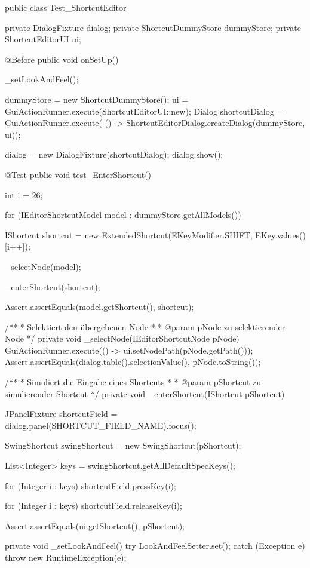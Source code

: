 \vspace{-12px}
  \begin{spacing}{0.75}
    \begin{javacode}[firstnumber=21]
public class Test_ShortcutEditor
{
  private DialogFixture dialog;
  private ShortcutDummyStore dummyStore;
  private ShortcutEditorUI ui;
  
  @Before
  public void onSetUp()
  {
    _setLookAndFeel();
    
    dummyStore = new ShortcutDummyStore();
    ui = GuiActionRunner.execute(ShortcutEditorUI::new);
    Dialog shortcutDialog = GuiActionRunner.execute(
    () -> ShortcutEditorDialog.createDialog(dummyStore, ui));
    
    dialog = new DialogFixture(shortcutDialog);
    dialog.show();
  }
  
  @Test
  public void test_EnterShortcut()
  {
    int i = 26;
    
    for (IEditorShortcutModel model : dummyStore.getAllModels())
    {
      IShortcut shortcut = new ExtendedShortcut(EKeyModifier.SHIFT, EKey.values()[i++]);
      
      _selectNode(model);
      
      _enterShortcut(shortcut);
      
      Assert.assertEquals(model.getShortcut(), shortcut);
    }
  }
  
  /**
  * Selektiert den übergebenen Node
  * 
  * @param pNode zu selektierender Node
  */
  private void _selectNode(IEditorShortcutNode pNode)
  {
    GuiActionRunner.execute(() -> ui.setNodePath(pNode.getPath()));
    Assert.assertEquals(dialog.table().selectionValue(), pNode.toString());
  }
  
  /**
  * Simuliert die Eingabe eines Shortcuts
  * 
  * @param pShortcut zu simulierender Shortcut
  */
  private void _enterShortcut(IShortcut pShortcut)
  {
    JPanelFixture shortcutField = dialog.panel(SHORTCUT_FIELD_NAME).focus();
    
    SwingShortcut swingShortcut = new SwingShortcut(pShortcut);
    
    List<Integer> keys = swingShortcut.getAllDefaultSpecKeys();
    
    for (Integer i : keys)
    shortcutField.pressKey(i);
    
    for (Integer i : keys)
    shortcutField.releaseKey(i);
    
    Assert.assertEquals(ui.getShortcut(), pShortcut);
  }
  
  private void _setLookAndFeel()
  {
    try
    {
      LookAndFeelSetter.set();
    }
    catch (Exception e)
    {
      throw new RuntimeException(e);
    }
  }
}

\end{javacode}
\end{spacing}